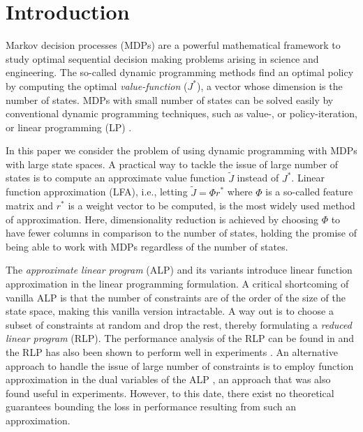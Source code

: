 \section{Introduction}
Markov decision processes (MDPs) are a powerful mathematical framework to study optimal sequential decision making problems  arising in science and engineering. The so-called dynamic programming methods find an optimal policy by computing the optimal \emph{value-function} ($J^*$), a vector whose dimension is the number of states. MDPs with small number of states can be solved easily by conventional dynamic programming techniques, such as value-, or policy-iteration, or linear programming (LP) \cite{BertB}. 

In this paper we consider the problem of using dynamic programming with MDPs with large state spaces.
A practical way to tackle the issue of large number of states is to compute an approximate value function $\tilde{J}$ instead of $J^*$. %
Linear function approximation (LFA), i.e., letting $\tilde{J}=\Phi r^*$ where $\Phi$ is a so-called feature matrix and $r^*$ is a weight vector to be computed, is the most widely used method of approximation. Here, dimensionality reduction is achieved by choosing $\Phi$ to have fewer columns in comparison to the number of states, holding the promise of being able to work with MDPs regardless of the number of states.

The \emph{approximate linear program} (ALP) \cite{ALP,CS,SALP,ALP-Bor} and its variants introduce linear function approximation in the linear programming formulation. A critical shortcoming of vanilla ALP is that the number of constraints are of the order of the size of the state space, making this vanilla version intractable. A way out is to choose a subset of constraints at random and drop the rest, thereby formulating a \emph{reduced linear program} (RLP). The performance analysis of the RLP can be found in \cite{CS} and the RLP has also been shown to perform well in experiments \cite{ALP,CS,CST}. An alternative approach to handle the issue of large number of constraints is to employ function approximation in the dual variables of the ALP \cite{ALP-Bor,dolgov}, an approach that was also found useful in experiments. However, to this date, there exist no theoretical guarantees bounding the loss in performance resulting from such an approximation.

